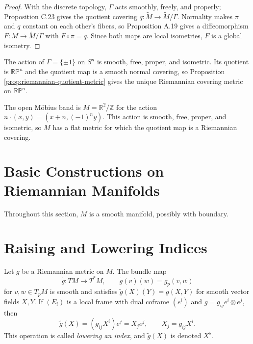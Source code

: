 \begin{proof}
\sketch With the discrete topology, $\Gamma$ acts smoothly, freely, and properly; Proposition C.23 gives the quotient covering $q:\widetilde M\to\widetilde M/\Gamma$. Normality makes $\pi$ and $q$ constant on each other's fibers, so Proposition A.19 gives a diffeomorphism $F:M\to\widetilde M/\Gamma$ with $F\circ\pi=q$. Since both maps are local isometries, $F$ is a global isometry.
\end{proof}

\begin{example}
\label{ex:real-projective-space-metric}
The action of $\Gamma=\{\pm1\}$ on $S^n$ is smooth, free, proper, and isometric. Its quotient is $\mathbb{RP}^n$ and the quotient map is a smooth normal covering, so Proposition \ref{prop:riemannian-quotient-metric} gives the unique Riemannian covering metric on $\mathbb{RP}^n$.
\end{example}

\begin{example}
\label{ex:open-mobius-band}
The open Möbius band is $M=\mathbb R^2/\mathbb Z$ for the action
$n\cdot(x,y)=(x+n,(-1)^ny)$. This action is smooth, free, proper, and
isometric, so $M$ has a flat metric for which the quotient map is a Riemannian
covering.
\end{example}

\section{Basic Constructions on Riemannian Manifolds}

Throughout this section, $M$ is a smooth manifold, possibly with boundary.

\section{Raising and Lowering Indices}

Let $g$ be a Riemannian metric on $M$. The bundle map
\[
\widetilde g\colon TM\longrightarrow T^*M,
\qquad \widetilde g(v)(w)=g_p(v,w)
\]
for $v,w\in T_pM$ is smooth and satisfies $\widetilde g(X)(Y)=g(X,Y)$ for smooth
vector fields $X,Y$. If $(E_i)$ is a local frame with dual coframe $(e^i)$ and
$g=g_{ij}e^i\otimes e^j$, then
\[
\widetilde g(X)=(g_{ij}X^i)e^j=X_je^j,
\qquad X_j=g_{ij}X^i.
\]
This operation is called \emph{lowering an index}, and $\widetilde g(X)$ is denoted
$X^\flat$.

